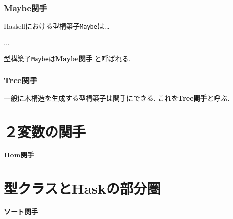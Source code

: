 \subsubsection{Maybe関手}
Haskellにおける型構築子\verb|Maybe|は...

...

型構築子\verb|Maybe|は{\bf Maybe関手}
と呼ばれる.
\subsubsection{Tree関手}
一般に木構造を生成する型構築子は関手にできる. これを{\bf Tree関手}と呼ぶ.


\section{２変数の関手}
{\bf Hom関手}

\section{型クラスとHaskの部分圏}
{\bf ソート関手}

